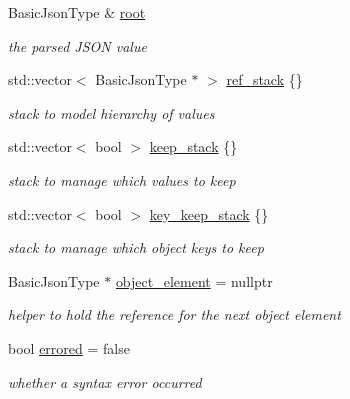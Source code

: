 \begin{DoxyCompactItemize}
\item 
Basic\+Json\+Type \& \hyperlink{classnlohmann_1_1detail_1_1json__sax__dom__callback__parser_a7b12037ca38be3ddec09c42bd71080cc}{root}
\begin{DoxyCompactList}\small\item\em the parsed J\+S\+ON value \end{DoxyCompactList}\item 
std\+::vector$<$ Basic\+Json\+Type $\ast$ $>$ \hyperlink{classnlohmann_1_1detail_1_1json__sax__dom__callback__parser_a82a0e49479660b9903597e1ef55c6601}{ref\+\_\+stack} \{\}
\begin{DoxyCompactList}\small\item\em stack to model hierarchy of values \end{DoxyCompactList}\item 
std\+::vector$<$ bool $>$ \hyperlink{classnlohmann_1_1detail_1_1json__sax__dom__callback__parser_ac24fd6c9f1b31b44328c16d65755ae76}{keep\+\_\+stack} \{\}
\begin{DoxyCompactList}\small\item\em stack to manage which values to keep \end{DoxyCompactList}\item 
std\+::vector$<$ bool $>$ \hyperlink{classnlohmann_1_1detail_1_1json__sax__dom__callback__parser_a8f0e96e8bc4f692169024105693f5706}{key\+\_\+keep\+\_\+stack} \{\}
\begin{DoxyCompactList}\small\item\em stack to manage which object keys to keep \end{DoxyCompactList}\item 
Basic\+Json\+Type $\ast$ \hyperlink{classnlohmann_1_1detail_1_1json__sax__dom__callback__parser_a2a8adecd936ba6ec187f1216241b508f}{object\+\_\+element} = nullptr
\begin{DoxyCompactList}\small\item\em helper to hold the reference for the next object element \end{DoxyCompactList}\item 
bool \hyperlink{classnlohmann_1_1detail_1_1json__sax__dom__callback__parser_ab06baaa640cfaae5846daa7c3594b116}{errored} = false
\begin{DoxyCompactList}\small\item\em whether a syntax error occurred \end{DoxyCompactList}\item 

\end{DoxyCompactItemize}
